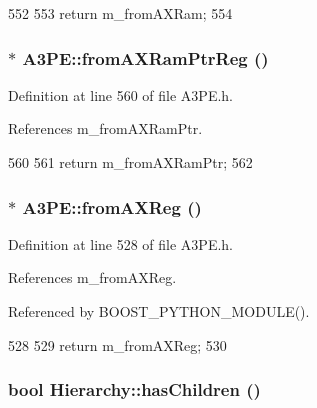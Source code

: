 \begin{DoxyCode}
552                   {
553     return m_fromAXRam;
554   }
\end{DoxyCode}
\hypertarget{classA3PE_aad21357e25e3d4e2bed779040de52e13}{
\subsubsection[{fromAXRamPtrReg}]{$\ast$ A3PE::fromAXRamPtrReg ()}}
\label{classA3PE_aad21357e25e3d4e2bed779040de52e13}


Definition at line 560 of file A3PE.h.

References m\_\-fromAXRamPtr.


\begin{DoxyCode}
560                              {
561     return m_fromAXRamPtr;
562   }
\end{DoxyCode}
\hypertarget{classA3PE_a0b2fabe7e7941f33de210d9385b7afce}{
\subsubsection[{fromAXReg}]{$\ast$ A3PE::fromAXReg ()}}
\label{classA3PE_a0b2fabe7e7941f33de210d9385b7afce}


Definition at line 528 of file A3PE.h.

References m\_\-fromAXReg.

Referenced by BOOST\_\-PYTHON\_\-MODULE().


\begin{DoxyCode}
528                        {
529     return m_fromAXReg;
530   }
\end{DoxyCode}
\hypertarget{classHierarchy_a255174fe4d316d2a3f430dcb9dab29f1}{
\subsubsection[{hasChildren}]{\setlength{\rightskip}{0pt plus 5cm}bool Hierarchy::hasChildren ()}}
\label{classHierarchy_a255174fe4d316d2a3f430dcb9dab29f1}


